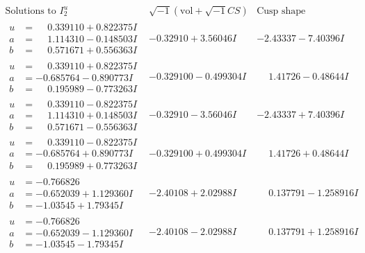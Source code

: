 \documentclass[1p]{elsarticle_modified}
\theoremstyle{definition}
\newcommand{\I}{\sqrt{-1}}
\begin{document}
$$\begin{array}{c|c|c}  
\text{Solutions to }I^u_{2}& \I (\text{vol} + \sqrt{-1}CS) & \text{Cusp shape}\\
 \hline 
\begin{aligned}
u &= \phantom{-}0.339110 + 0.822375 I \\
a &= \phantom{-}1.114310 - 0.148503 I \\
b &= \phantom{-}0.571671 + 0.556363 I\end{aligned}
 & -0.32910 + 3.56046 I & -2.43337 - 7.40396 I \\ \hline\begin{aligned}
u &= \phantom{-}0.339110 + 0.822375 I \\
a &= -0.685764 - 0.890773 I \\
b &= \phantom{-}0.195989 - 0.773263 I\end{aligned}
 & -0.329100 - 0.499304 I & \phantom{-}1.41726 - 0.48644 I \\ \hline\begin{aligned}
u &= \phantom{-}0.339110 - 0.822375 I \\
a &= \phantom{-}1.114310 + 0.148503 I \\
b &= \phantom{-}0.571671 - 0.556363 I\end{aligned}
 & -0.32910 - 3.56046 I & -2.43337 + 7.40396 I \\ \hline\begin{aligned}
u &= \phantom{-}0.339110 - 0.822375 I \\
a &= -0.685764 + 0.890773 I \\
b &= \phantom{-}0.195989 + 0.773263 I\end{aligned}
 & -0.329100 + 0.499304 I & \phantom{-}1.41726 + 0.48644 I \\ \hline\begin{aligned}
u &= -0.766826\phantom{ +0.000000I} \\
a &= -0.652039 + 1.129360 I \\
b &= -1.03545 + 1.79345 I\end{aligned}
 & -2.40108 + 2.02988 I & \phantom{-}0.137791 - 1.258916 I \\ \hline\begin{aligned}
u &= -0.766826\phantom{ +0.000000I} \\
a &= -0.652039 - 1.129360 I \\
b &= -1.03545 - 1.79345 I\end{aligned}
 & -2.40108 - 2.02988 I & \phantom{-}0.137791 + 1.258916 I \\ \hline\begin{aligned}

\end{aligned}
\end{array}$$
\end{document}
